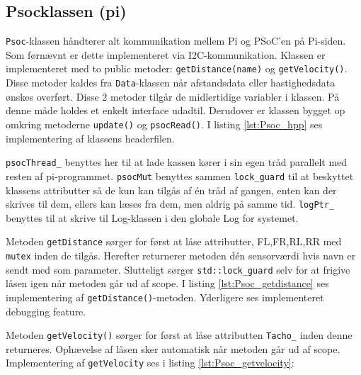 \subsection{Psocklassen (pi)}

\texttt{Psoc}-klassen håndterer alt kommunikation mellem Pi og PSoC'en på Pi-siden. Som førnævnt er dette implementeret via I2C-kommunikation. Klassen er implementeret med to public metoder: \texttt{getDistance(name)} og \texttt{getVelocity()}. Disse metoder kaldes fra \texttt{Data}-klassen når afstandsdata eller hastighedsdata ønskes overført. Disse 2 metoder tilgår de midlertidige variabler i klassen. På denne måde holdes et enkelt interface udadtil. Derudover er klassen bygget op omkring metoderne \texttt{update()} og \texttt{psocRead()}. I listing \ref{lst:Psoc_hpp} ses implementering af klassens headerfilen.


	
	
\texttt{psocThread\_} benyttes her til at lade kassen kører i sin egen tråd parallelt med resten af pi-programmet. \texttt{psocMut} benyttes sammen \texttt{lock\_guard} til at beskyttet klassens attributter så de kun kan tilgås af én tråd af gangen, enten kan der skrives til dem, ellers kan læses fra dem, men aldrig på samme tid. \texttt{logPtr\_} benyttes til at skrive til Log-klassen i den globale Log for systemet.


Metoden \texttt{getDistance} sørger for først at låse attributter, FL,FR,RL,RR med \texttt{mutex} inden de tilgås. Herefter returnerer metoden dén sensorværdi hvis navn er sendt med som parameter. Slutteligt sørger \texttt{std::lock\_guard} selv for at frigive låsen igen når metoden går ud af scope. I listing \ref{lst:Psoc_getdistance} ses implementering af \texttt{getDistance()}-metoden. Yderligere ses implementeret debugging feature.


	

Metoden \texttt{getVelocity()} sørger for først at låse attributten \texttt{Tacho\_} inden denne returneres. Ophævelse af låsen sker automatisk når metoden går ud af scope. Implementering af \texttt{getVelocity} ses i listing \ref{lst:Psoc_getvelocity}:




